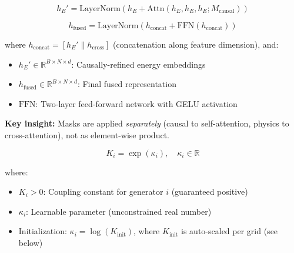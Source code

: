 \begin{equation}
\label{eq:causal_self_attn}
h_E' = \text{LayerNorm}\left( h_E + \text{Attn}(h_E, h_E, h_E; M_{\text{causal}}) \right)
\end{equation}

\begin{equation}
\label{eq:hierarchical_fusion}
h_{\text{fused}} = \text{LayerNorm}\left( h_{\text{concat}} + \text{FFN}(h_{\text{concat}}) \right)
\end{equation}

\noindent where $h_{\text{concat}} = [h_E' \| h_{\text{cross}}]$ (concatenation along feature dimension), and:
\begin{itemize}
    \item $h_E' \in \mathbb{R}^{B \times N \times d}$: Causally-refined energy embeddings
    \item $h_{\text{fused}} \in \mathbb{R}^{B \times N \times d}$: Final fused representation
    \item $\text{FFN}$: Two-layer feed-forward network with GELU activation
\end{itemize}

\textbf{Key insight:} Masks are applied \textit{separately} (causal to self-attention, physics to cross-attention), not as element-wise product.




\begin{equation}
\label{eq:coupling_param}
K_i = \exp(\kappa_i), \quad \kappa_i \in \mathbb{R}
\end{equation}

\noindent where:
\begin{itemize}
    \item $K_i > 0$: Coupling constant for generator $i$ (guaranteed positive)
    \item $\kappa_i$: Learnable parameter (unconstrained real number)
    \item Initialization: $\kappa_i = \log(K_{\text{init}})$, where $K_{\text{init}}$ is auto-scaled per grid (see below)
\end{itemize}

